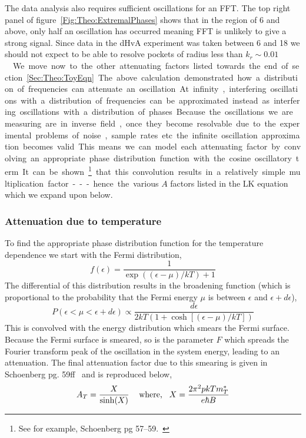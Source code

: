 The data analysis also requires sufficient oscillations for an \ac{FFT}. The top right panel of figure~\ref{Fig:Theo:ExtremalPhases} shows that in the region of \unit{6}{\tesla} and above, only half an oscillation has occurred meaning \ac{FFT} is unlikely to give a strong signal. Since data in the \ac{dHvA} experiment was taken between \unit{6}{\tesla} and \unit{18}{\tesla} we should not expect to be able to resolve pockets of radius less than \unit{$k_r\sim 0.01$}{\reciprocal\angstrom}.

We move now to the other attenuating factors listed towards the end of section~\ref{Sec:Theo:ToyEqn}. The above calculation demonstrated how a distribution of frequencies can attenuate an oscillation. At infinity, interfering oscillations with a distribution of frequencies can be approximated instead as interfering oscillations with a distribution of phases. Because the oscillations we are measuring are in inverse field, once they become resolvable due to the experimental problems of noise, sample rates etc. the infinite oscillation approximation becomes valid. This means we can model each attenuating factor by convolving an appropriate phase distribution function with the cosine oscillatory term. It can be shown\footnote{See for example, Schoenberg pg 57--59.~\cite{Schoenberg1984}} that this convolution results in a relatively simple multiplication factor --- hence the various $A$ factors listed in the \ac{LK} equation which we expand upon below.

\subsubsection{Attenuation due to temperature}

To find the appropriate phase distribution function for the temperature dependence we start with the Fermi distribution,
\begin{equation}
\label{Eqn:Theo:FermiFunction}
f(\epsilon) = \frac{1}{\exp\left((\epsilon-\mu)/kT\right) + 1}
\end{equation} 
The differential of this distribution results in the broadening function (which is proportional to the probability that the Fermi energy $\mu$ is between $\epsilon$ and $\epsilon + d\epsilon$),
\begin{equation}
  P(\epsilon < \mu < \epsilon + d\epsilon) \propto \frac{d\epsilon}{2kT(1 + \cosh[(\epsilon - \mu)/kT])}
\end{equation}
This is convolved with the energy distribution which smears the Fermi surface. Because the Fermi surface is smeared, so is the parameter $F$ which spreads the Fourier transform peak of the oscillation in the system energy, leading to an attenuation. The final attenuation factor due to this smearing is given in Schoenberg pg. 59ff~\cite{Schoenberg1984} and is reproduced below,
\begin{equation}
\label{Eqn:Theo:TemperatureTerm}
  A_T = \frac{X}{\sinh(X)} \textrm{\hspace{0.3cm} where,\hspace{0.3cm}} X = \frac{2\pi^2pkT m^*_T}{e\hbar B}
\end{equation}


